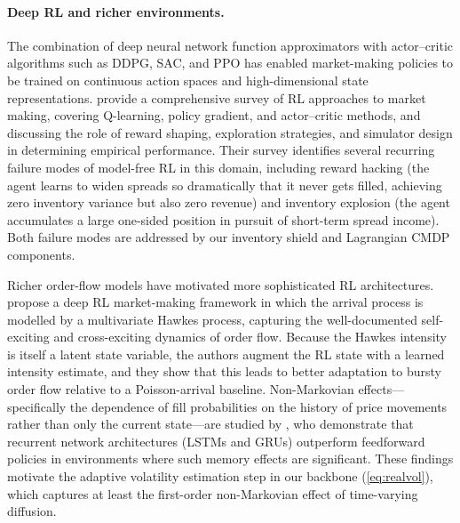 \documentclass[11pt]{article}
\begin{document}
\paragraph{Deep RL and richer environments.}
The combination of deep neural network function approximators with
actor--critic algorithms such as DDPG, SAC, and PPO has enabled
market-making policies to be trained on continuous action spaces and
high-dimensional state representations.
\textcite{gasperov2021rlmm} provide a comprehensive survey of RL
approaches to market making, covering Q-learning, policy gradient, and
actor--critic methods, and discussing the role of reward shaping,
exploration strategies, and simulator design in determining empirical
performance.
Their survey identifies several recurring failure modes of model-free RL
in this domain, including reward hacking (the agent learns to widen
spreads so dramatically that it never gets filled, achieving zero
inventory variance but also zero revenue) and inventory explosion (the
agent accumulates a large one-sided position in pursuit of short-term
spread income).
Both failure modes are addressed by our inventory shield and Lagrangian
CMDP components.

Richer order-flow models have motivated more sophisticated RL
architectures.
\textcite{gasperov2022hawkesmm} propose a deep RL market-making framework
in which the arrival process is modelled by a multivariate Hawkes
process, capturing the well-documented self-exciting and cross-exciting
dynamics of order flow.
Because the Hawkes intensity is itself a latent state variable, the
authors augment the RL state with a learned intensity estimate, and they
show that this leads to better adaptation to bursty order flow relative
to a Poisson-arrival baseline.
Non-Markovian effects---specifically the dependence of fill probabilities
on the history of price movements rather than only the current state---are
studied by \textcite{lalor2025nonmarkov}, who demonstrate that recurrent
network architectures (LSTMs and GRUs) outperform feedforward policies
in environments where such memory effects are significant.
These findings motivate the adaptive volatility estimation step in our
backbone (\eqref{eq:realvol}), which captures at least the
first-order non-Markovian effect of time-varying diffusion.
\end{document}

